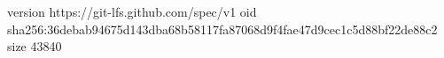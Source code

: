version https://git-lfs.github.com/spec/v1
oid sha256:36debab94675d143dba68b58117fa87068d9f4fae47d9cec1c5d88bf22de88c2
size 43840
